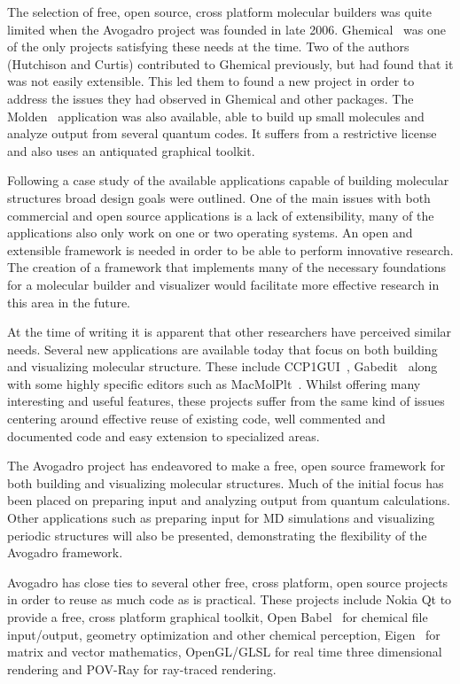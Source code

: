 \documentclass[10pt]{bmc_article}
\newenvironment{bmcformat}{\begin{raggedright}
\baselineskip20pt\sloppy\setboolean{publ}{false}}{\end{raggedright}
\baselineskip20pt\sloppy}
\begin{document}
\begin{bmcformat}
The selection of free, open source, cross platform molecular builders was quite
limited when the Avogadro project was founded in late 2006.
Ghemical~\cite{Ghemical} was one of the only projects satisfying these needs at
the time. Two of the authors (Hutchison and Curtis) contributed to Ghemical
previously, but had found that it was not easily extensible. This led them to
found a new project in order to address the issues they had observed in Ghemical
and other packages. The Molden~\cite{Molden} application was also available,
able to build up small molecules and analyze output from several quantum codes.
It suffers from a restrictive license and also uses an antiquated graphical
toolkit.

Following a case study of the available applications capable of building
molecular structures broad design goals were outlined. One of the main issues
with both commercial and open source applications is a lack of extensibility,
many of the applications also only work on one or two operating systems. An open
and extensible framework is needed in order to be able to perform innovative
research. The creation of a framework that implements many of the necessary
foundations for a molecular builder and visualizer would facilitate more
effective research in this area in the future.

At the time of writing it is apparent that other researchers have perceived
similar needs. Several new applications are available today that focus on both
building and visualizing molecular structure. These include
CCP1GUI~\cite{CCP1GUI}, Gabedit~\cite{Gabedit} along with some highly specific
editors such as MacMolPlt~\cite{MacMolPlt}. Whilst offering many interesting and
useful features, these projects suffer from the same kind of issues centering
around effective reuse of existing code, well commented and documented code and
easy extension to specialized areas.

The Avogadro project has endeavored to make a free, open source framework for
both building and visualizing molecular structures. Much of the initial focus
has been placed on preparing input and analyzing output from quantum
calculations. Other applications such as preparing input for MD simulations and
visualizing periodic structures will also be presented, demonstrating the
flexibility of the Avogadro framework.

Avogadro has close ties to several other free, cross platform, open source
projects in order to reuse as much code as is practical. These projects include
Nokia Qt to provide a free, cross platform graphical toolkit, Open
Babel~\cite{OpenBabel} for chemical file input/output, geometry optimization and
other chemical perception, Eigen~\cite{Eigen} for matrix and vector mathematics,
OpenGL/GLSL for real time three dimensional rendering and POV-Ray for ray-traced
rendering.


\end{bmcformat}
\end{document}
